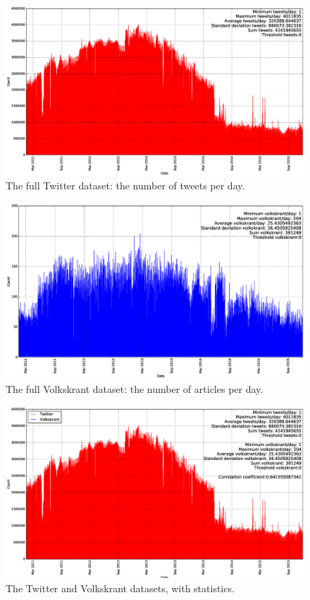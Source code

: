 \documentclass[paper=a4, fontsize=9px]{scrartcl} %
\numberwithin{equation}{section} %
\numberwithin{figure}{section} %
\numberwithin{table}{section} %
\begin{document}
\begin{figure}
	\centerline{\includegraphics[width=1.2\textwidth]{img/twitter_plot_no_threshold}}
	\caption{The full Twitter dataset: the number of tweets per day.}\label{fig:3}
\end{figure}
\begin{figure}
	\centerline{\includegraphics[width=1.2\textwidth]{img/volkskrant_plot_no_threshold}}
	\caption{The full Volkskrant dataset: the number of articles per day.}\label{fig:4}
\end{figure}
\begin{figure}
	\centerline{\includegraphics[width=1.2\textwidth]{img/volkskrant_twitter_plot_no_threshold}}
	\caption{The Twitter and Volkskrant datasets, with statistics.}\label{fig:7}
\end{figure}
\end{document}
